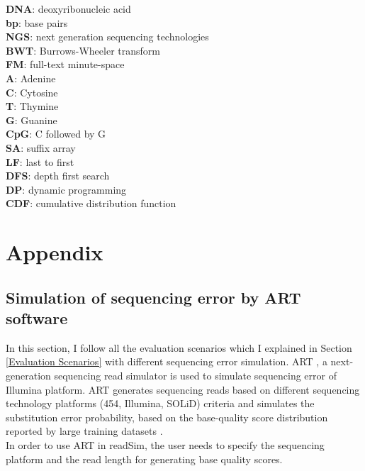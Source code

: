 \documentclass[11pt,a4paper]{report}
\begin{document}
\textbf{DNA}: deoxyribonucleic acid\\
\textbf{bp}: base pairs\\
\textbf{NGS}: next generation sequencing technologies\\
\textbf{BWT}: Burrows-Wheeler transform\\
\textbf{FM}: full-text minute-space\\
\textbf{A}: Adenine\\
\textbf{C}: Cytosine\\
\textbf{T}: Thymine\\
\textbf{G}: Guanine\\
\textbf{CpG}: C followed by G\\
\textbf{SA}: suffix array\\
\textbf{LF}: last to first\\
\textbf{DFS}: depth first search\\
\textbf{DP}: dynamic programming\\
\textbf{CDF}: cumulative distribution function




\newpage
\appendix
\section*{Appendix}
\renewcommand{\thesubsection}{\Alph{subsection}}

\subsection{Simulation of sequencing error by ART software} 
\label{Simulation sequencing error by ART software}

In this section, I follow all the evaluation scenarios which I explained in
Section \ref{Evaluation Scenarios}  with different sequencing error simulation.
ART \cite{art}, a next-generation sequencing read simulator is used to simulate sequencing
error of Illumina platform. 
ART generates sequencing reads based on different sequencing technology 
platforms (454, Illumina, SOLiD) criteria \cite{art} and simulates the
substitution error probability, based on the base-quality 
score distribution reported by large training datasets \cite{art}.\\

In order to use ART in readSim, the user needs to specify the sequencing
platform and the read length for generating base quality scores.\\
\end{document}
